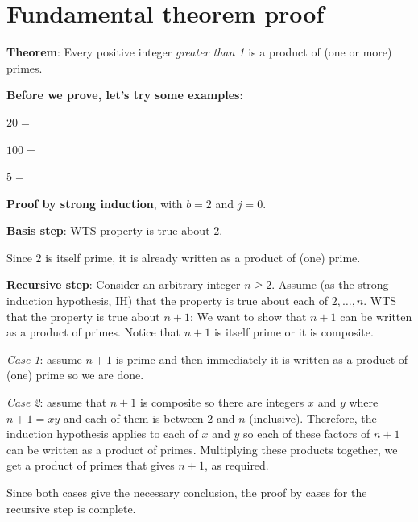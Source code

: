 \documentclass[12pt, oneside]{article}
\begin{document}
\begin{flushright}
\end{flushright} \section*{Fundamental theorem proof}


{\bf Theorem}: Every positive integer {\it greater than 1} is a product of (one or more) primes.

{\bf Before we prove, let's try some examples}:

$20 = $

$100 = $

$5 = $


{\bf Proof by strong induction}, with $b=2$ and $j=0$.

{\bf Basis step}:  WTS property is true about  $2$.

Since $2$ is itself prime,
it is already written as a product of (one) prime.


{\bf Recursive step}: Consider an arbitrary integer $n \geq 2$.
Assume (as the strong induction hypothesis, IH) that the property is true about  each of $2, \ldots, n$.  
WTS that the property is true about  $n+1$: We want to show that $n+1$ can be written 
as a product of primes.  Notice that $n+1$ is itself prime or it is composite.

{\it Case 1}: assume $n+1$ is prime and then immediately it is written as a product
of (one) prime so we are done.  

{\it Case 2}: assume that $n+1$ is composite
so there are integers $x$ and $y$ where $n+1 = xy$ and each of them is between $2$ and $n$
(inclusive).  Therefore, the induction hypothesis applies to each of $x$ and $y$ so each 
of these factors of $n+1$ can be written as a product of primes.  Multiplying these products together, 
we get a product of primes that gives $n+1$, as required. 

Since both cases give the necessary
conclusion, the proof by cases for the recursive step is complete. \vfill
\end{document}
